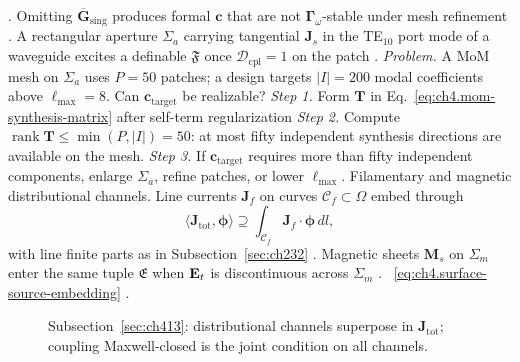 \cite{harrington2001}. Omitting \(\overline{\mathbf{G}}_{\mathrm{sing}}\) produces formal \(\mathbf{c}\) that are not
\(\boldsymbol{\Gamma}_\omega\)-stable under mesh refinement \cite{devaney2004}.
A rectangular aperture \(\Sigma_{a}\) carrying tangential \(\mathbf{J}_{s}\) in the TE\(_{10}\) port mode of a
waveguide excites a definable \(\mathfrak{F}\) once \(\mathcal{D}_{\mathrm{cpl}}=1\) on the patch
\cite{collin2001}. 
\emph{Problem.} A MoM mesh on \(\Sigma_{a}\) uses \(P=50\) patches; a design targets \(|I|=200\) modal
coefficients above \(\ell_{\max}=8\). Can \(\mathbf{c}_{\mathrm{target}}\) be realizable?
\emph{Step 1.} Form \(\mathbf{T}\) in Eq.~\eqref{eq:ch4.mom-synthesis-matrix} after self-term regularization
\emph{Step 2.} Compute \(\operatorname{rank}\mathbf{T}\le\min(P,|I|)=50\): at most fifty independent
synthesis directions are available on the mesh.
\emph{Step 3.} If \(\mathbf{c}_{\mathrm{target}}\) requires more than fifty independent components, enlarge
\(\Sigma_{a}\), refine patches, or lower \(\ell_{\max}\).
Filamentary and magnetic distributional channels. Line currents \(\mathbf{J}_{f}\) on curves \(\mathcal{C}_{f}\subset\Omega\) embed through
\begin{equation}
\label{eq:ch4.filament-embedding}
\langle\mathbf{J}_{\mathrm{tot}},\boldsymbol{\phi}\rangle
\supseteq
\int_{\mathcal{C}_{f}}\mathbf{J}_{f}\cdot\boldsymbol{\phi}\,dl,
\end{equation}
with line finite parts as in Subsection~\ref{sec:ch232} . Magnetic sheets
\(\mathbf{M}_{s}\) on \(\Sigma_{m}\) enter the same tuple \(\mathfrak{E}\) when \(\mathbf{E}_{t}\) is discontinuous across
\(\Sigma_{m}\) . ~\eqref{eq:ch4.surface-source-embedding} .
\begin{figure}[t]
\centering
{}
\caption{Subsection~\ref{sec:ch413}: distributional channels superpose in \(\mathbf{J}_{\mathrm{tot}}\); coupling
Maxwell-closed is the joint condition on all channels.}
\label{fig:ch4.distributional-channels}
\end{figure}
